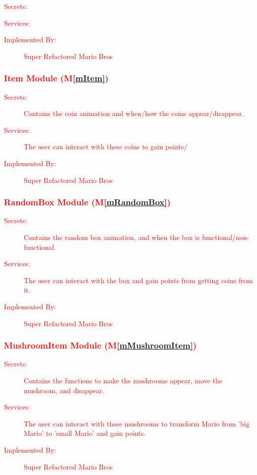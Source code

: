 \documentclass[12pt, titlepage]{article}
\newcommand{\mref}[1]{M\ref{#1}}
\begin{document}
\begin{description}
\item[\textcolor{red}{Secrets:}] \textcolor{red}{}
\item[\textcolor{red}{Services:}] \textcolor{red}{}
\item[\textcolor{red}{Implemented By:}] \textcolor{red}{Super Refactored Mario Bros}
\end{description}

\subsubsection{\textcolor{red}{Item Module (\mref{mItem})}}

\begin{description}
\item[\textcolor{red}{Secrets:}] \textcolor{red}{Contains the coin animation and when/how the coins appear/disappear.}
\item[\textcolor{red}{Services:}] \textcolor{red}{The user can interact with these coins to gain points/}
\item[\textcolor{red}{Implemented By:}] \textcolor{red}{Super Refactored Mario Bros}
\end{description}

\subsubsection{\textcolor{red}{RandomBox Module (\mref{mRandomBox})}}

\begin{description}
\item[\textcolor{red}{Secrets:}] \textcolor{red}{Contains the random box animation, and when the box is functional/non-functional.}
\item[\textcolor{red}{Services:}] \textcolor{red}{The user can interact with the box and gain points from getting coins from it.}
\item[\textcolor{red}{Implemented By:}] \textcolor{red}{Super Refactored Mario Bros}
\end{description}

\subsubsection{\textcolor{red}{MushroomItem Module (\mref{mMushroomItem})}}

\begin{description}
\item[\textcolor{red}{Secrets:}] \textcolor{red}{Contains the functions to make the mushrooms appear, move the mushroom, and disappear.}
\item[\textcolor{red}{Services:}] \textcolor{red}{The user can interact with these mushrooms to transform Mario from 'big Mario' to 'small Mario' and gain points.}
\item[\textcolor{red}{Implemented By:}] \textcolor{red}{Super Refactored Mario Bros}
\end{description}
\end{document}
